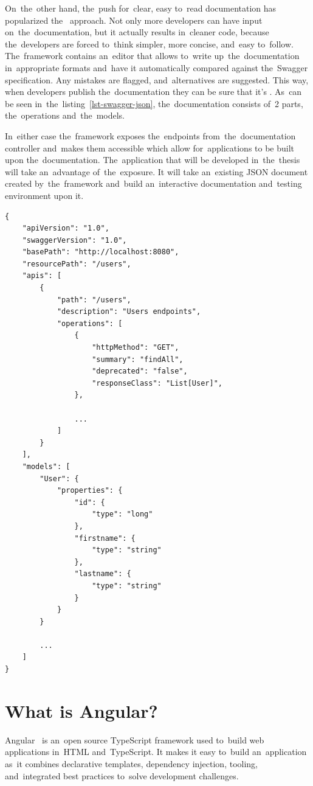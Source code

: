 On~the~other hand, the~push for~clear, easy to~read documentation has
popularized the~ approach. Not only more developers can have
input on~the~documentation, but it actually results in~cleaner code, because
the~developers are forced to~think simpler, more concise, and~easy to~follow.
The~framework contains an~editor that allows to~write up~the~documentation
in~appropriate formats and~have it automatically compared against the~Swagger
specification. Any mistakes are flagged, and~alternatives are suggested. This
way, when developers publish the~documentation they can be sure that it's
. As~can be seen in~the~listing~\ref{lst-swagger-json},
the~documentation consists of~2 parts, the~operations and~the~models.

In~either case the~framework exposes the~endpoints from~the~documentation
controller and~makes them accessible which allow for~applications to be built
upon the~documentation. The~application that will be developed in~the~thesis
will take an~advantage of~the~exposure. It will take an~existing JSON document
created by~the~framework and~build an~interactive documentation and~testing
environment upon it.
\pagebreak

\begin{lstlisting}[caption=An~example of~API documentation in~JSON format
created using the~Swagger framework., style=dp-default, label=lst-swagger-json]
{
	"apiVersion": "1.0",
	"swaggerVersion": "1.0",
	"basePath": "http://localhost:8080",
	"resourcePath": "/users",
	"apis": [
		{
			"path": "/users",
			"description": "Users endpoints",
			"operations": [
				{
					"httpMethod": "GET",
					"summary": "findAll",
					"deprecated": "false",
					"responseClass": "List[User]", 
				},
				
				... 
			]
		}
	],
	"models": [
		"User": {
			"properties": {
				"id": {
					"type": "long"
				},
				"firstname": {
					"type": "string"
				},
				"lastname": {
					"type": "string"
				}
			}
		}
		
		...	
	]
}
\end{lstlisting}


\section{What is Angular?}
Angular~\cite{Angular} is an~open source TypeScript framework used to~build web
applications in~HTML and~TypeScript. It makes it easy to~build an~application
as~it combines declarative templates, dependency injection, 
tooling, and~integrated best practices to~solve development challenges.


